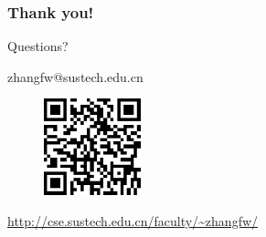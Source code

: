 \documentclass{beamer}
\begin{document}
\begin{frame}
\frametitle{Thank you!}
\begin{center}
{\huge Questions?}
\vspace{10pt}

zhangfw@sustech.edu.cn
\vspace{10pt}


\begin{figure}
\includegraphics[width=0.25\textwidth]{homepageqrcode.png}
\end{figure}

\vspace{-10pt}
\url{http://cse.sustech.edu.cn/faculty/~zhangfw/}

\end{center}

\end{frame}


\begin{frame}[allowframebreaks]
	
	
\end{frame}
\end{document}
